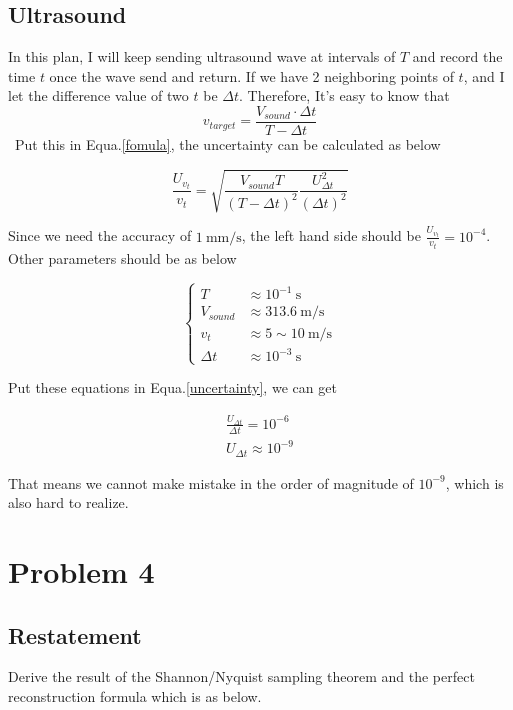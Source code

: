 \documentclass{article}
\begin{document}
\subsection{Ultrasound} In this plan, I will keep sending ultrasound wave at
 intervals of $T$ and record the time $t$ once the wave send and return. If
 we have 2 neighboring points of $t$, and I let the difference value of two
 $t$ be $\Delta t$. Therefore, It's easy to know that
\begin{equation} v_{target} = \frac{V_{sound}  \cdot \Delta t}{T - \Delta t}
\end{equation}
\
Put this in Equa.\ref{fomula}, the uncertainty can be calculated as below

\begin{equation}
    \label{uncertainty}
    \frac{U_{v_t}}{v_t} = \sqrt{\frac{V_{sound}T}{(T-\Delta t)^2} \frac{U_
     {\Delta t}^2}{(\Delta t)^2}}
\end{equation}

Since we need the accuracy of $1~\mathrm{mm/s}$, the left hand side should be
$\frac{U_{v_t}}{v_t} = 10^{-4}$. Other parameters should be as below

\begin{equation*}
    \left\{
    \begin{array}{ll} T         & \approx 10^{-1} ~ \mathrm{s}     \\ V_
     {sound} & \approx 313.6 ~ \mathrm{m/s}     \\ v_t       & \approx 5 \sim
     10 ~ \mathrm{m/s} \\
        \Delta t  & \approx 10^{-3} ~ \mathrm{s}
    \end{array}
    \right.
\end{equation*}

Put these equations in Equa.\ref{uncertainty}, we can get

\begin{gather}
    \frac{U_{\Delta t}}{\Delta t} = 10^{-6}\\ U_{\Delta t} \approx 10^{-9}
\end{gather}

That means we cannot make mistake in the order of magnitude of $10^
{-9}$, which is also hard to realize.


\section{Problem 4}
\subsection{Restatement} Derive the result of the Shannon/Nyquist sampling
 theorem and the perfect reconstruction formula which is as below.
\end{document}
